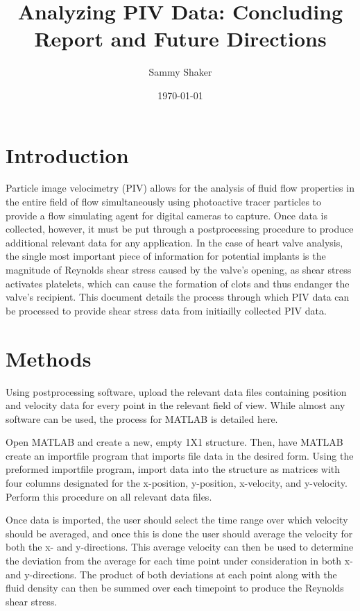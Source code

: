 \documentclass{article}
\title{Analyzing PIV Data: Concluding Report and Future Directions}
\author{Sammy Shaker}
\date{\today}
\begin{document}
\maketitle

\section*{Introduction}
Particle image velocimetry (PIV) allows for the analysis of fluid flow properties in the entire field of flow simultaneously using photoactive tracer particles to provide a flow simulating agent for digital cameras to capture. Once data is collected, however, it must be put through a postprocessing procedure to produce additional relevant data for any application. In the case of heart valve analysis, the single most important piece of information for potential implants is the magnitude of Reynolds shear stress caused by the valve's opening, as shear stress activates platelets, which can cause the formation of clots and thus endanger the valve's recipient. This document details the process through which PIV data can be processed to provide shear stress data from initiailly collected PIV data.

\section*{Methods}
Using postprocessing software, upload the relevant data files containing position and velocity data for every point in the relevant field of view. While almost any software can be used, the process for MATLAB is detailed here.

Open MATLAB and create a new, empty 1X1 structure. Then, have MATLAB create an importfile program that imports file data in the desired form. Using the preformed importfile program, import data into the structure as matrices with four columns designated for the x-position, y-position, x-velocity, and y-velocity. Perform this procedure on all relevant data files.

Once data is imported, the user should select the time range over which velocity should be averaged, and once this is done the user should average the velocity for both the x- and y-directions. This average velocity can then be used to determine the deviation from the average for each time point under consideration in both x- and y-directions. The product of both deviations at each point along with the fluid density can then be summed over each timepoint to produce the Reynolds shear stress.
\end{document}
